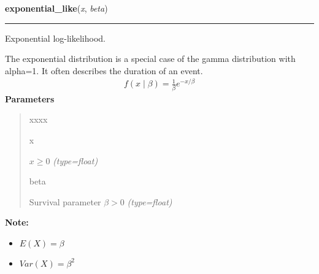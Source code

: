 \hspace{.8\funcindent}\begin{boxedminipage}{\funcwidth}

    \raggedright \textbf{exponential\_like}(\textit{x}, \textit{beta})

    \vspace{-1.5ex}

    \rule{\textwidth}{1pt}
\setlength{\parskip}{2ex}

Exponential log-likelihood.

The exponential distribution is a special case of the gamma distribution
with alpha=1. It often describes the duration of an event.
\begin{equation*}\begin{split}f(x \mid \beta) = \frac{1}{\beta}e^{-x/\beta}\end{split}\end{equation*}\setlength{\parskip}{1ex}
      \textbf{Parameters}
      \vspace{-1ex}

      \begin{quote}
        \begin{Ventry}{xxxx}

          \item[x]


$x \ge 0$
            {\it (type=float)}

          \item[beta]


Survival parameter $\beta > 0$
            {\it (type=float)}

        \end{Ventry}

      \end{quote}

\textbf{Note:} \begin{itemize}
\item {} 
$E(X) = \beta$

\item {} 
$Var(X) = \beta^2$

\end{itemize}


    \end{boxedminipage}

    \label{pymc:distributions:exponweib_like}

    \vspace{0.5ex}

